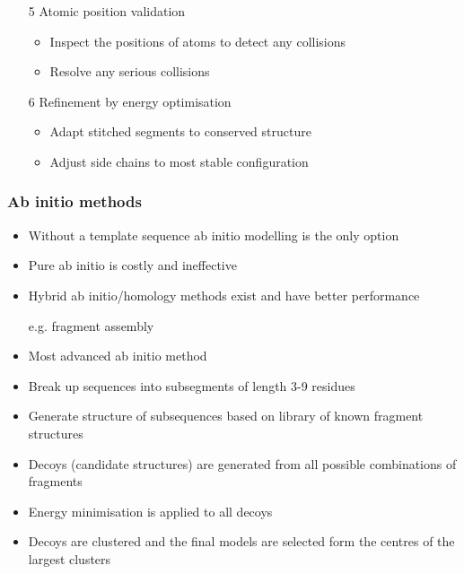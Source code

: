 \documentclass[a4paper]{article}
\begin{document}
\begin{enumerate}
  \item[5]
    Atomic position validation

    \begin{itemize}
      \item
        Inspect the positions of atoms to detect any collisions

      \item
        Resolve any serious collisions
    \end{itemize}

  \item[6]
    Refinement by energy optimisation

    \begin{itemize}
      \item
        Adapt stitched segments to conserved structure

      \item
        Adjust side chains to most stable configuration
    \end{itemize}
\end{enumerate}

\subsubsection{Ab initio methods}

\begin{itemize}
  \item
    Without a template sequence ab initio modelling is the only option

  \item
    Pure ab initio is costly and ineffective

  \item
    Hybrid ab initio/homology methods exist and have better performance

    e.g. fragment assembly
\end{itemize}


\begin{itemize}
  \item
    Most advanced ab initio method

  \item
    Break up sequences into subsegments of length 3-9 residues

  \item
    Generate structure of subsequences based on library of known fragment
    structures

  \item
    Decoys (candidate structures) are generated from all possible combinations
    of fragments

  \item
    Energy minimisation is applied to all decoys

  \item
    Decoys are clustered and the final models are selected form the centres of
    the largest clusters
\end{itemize}
\end{document}
